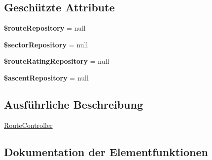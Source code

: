 \subsection*{Geschützte Attribute}
\begin{DoxyCompactItemize}
\item 
\mbox{\label{classCsp_1_1Pinkpoint_1_1Controller_1_1RouteController_aa8af27b732af67148b062a4cea468b2f}} 
{\bfseries \$route\+Repository} = null
\item 
\mbox{\label{classCsp_1_1Pinkpoint_1_1Controller_1_1RouteController_ac3c386832f7bfe2ccdca1a8c15a9fe55}} 
{\bfseries \$sector\+Repository} = null
\item 
\mbox{\label{classCsp_1_1Pinkpoint_1_1Controller_1_1RouteController_a548b842e5626a19bf2f9634b6805b608}} 
{\bfseries \$route\+Rating\+Repository} = null
\item 
\mbox{\label{classCsp_1_1Pinkpoint_1_1Controller_1_1RouteController_add84299fe3e53c481541a5d8d171ab67}} 
{\bfseries \$ascent\+Repository} = null
\end{DoxyCompactItemize}


\subsection{Ausführliche Beschreibung}
\hyperlink{classCsp_1_1Pinkpoint_1_1Controller_1_1RouteController}{Route\+Controller} 

\subsection{Dokumentation der Elementfunktionen}
\mbox{\label{classCsp_1_1Pinkpoint_1_1Controller_1_1RouteController_ab6d23c18874f1d1a89a37e6973ce30fc}} 

